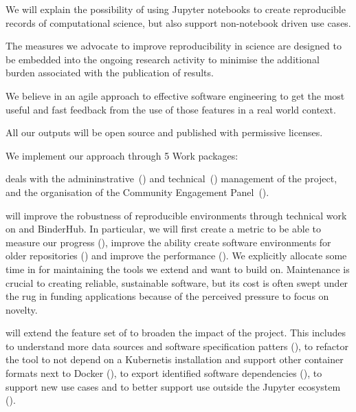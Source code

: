 \begin{compactenum}
\item We will explain the possibility of using Jupyter notebooks to create
  reproducible records of computational science, but also support non-notebook
  driven use cases.
\item The measures we advocate to improve reproducibility in science are
  designed to be embedded into the ongoing research activity to minimise the
  additional burden associated with the publication of results.
\item We believe in an agile approach to effective software engineering to get
  the most useful and fast feedback from the use of those features in a real
  world context.
\item All our outputs will be open source and published with permissive
  licenses.
\end{compactenum}


\medskip
\noindent We implement our approach through 5 Work packages:

{} deals with the admininstrative~()
and technical~() management of the
project, and the organisation of the Community Engagement
Panel~().

     will improve the robustness of reproducible
    environments through technical work on \repotodocker{} and BinderHub. In
    particular, we will first create a metric to be able to measure our progress
    (), improve the ability create
    software environments for older repositories
    () and improve the
    performance (). We
    explicitly allocate some time in  for
    maintaining the tools we extend and want to build on. Maintenance is crucial
    to creating reliable, sustainable software, but its cost is often swept
    under the rug in funding applications because of the perceived pressure to
    focus on novelty.

     will extend the feature set of \repotodocker{} to broaden
    the impact of the project. This
    includes to understand more data sources and software specification patters
    (), to refactor the tool to not depend on a
    Kubernetis installation and support other container formats next to Docker
    (), to export identified software dependencies
    (), to support new use cases and to
    better support use outside the Jupyter ecosystem ().

